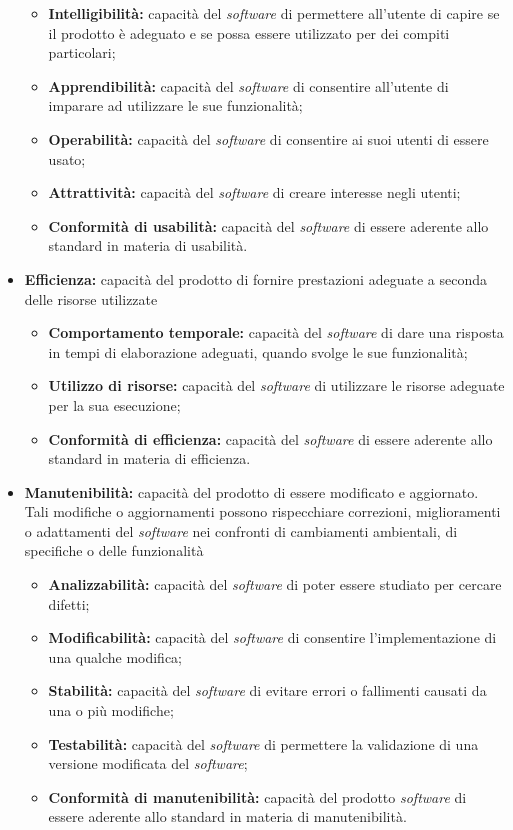 \begin{itemize}
	\begin{itemize}
		\item \textbf{Intelligibilità:} capacità del \textit{software} di 
		permettere all'utente di capire se il prodotto è adeguato e se possa 
		essere utilizzato per dei compiti particolari;
		\item \textbf{Apprendibilità:} capacità del \textit{software} di 
		consentire all'utente di imparare ad utilizzare le sue funzionalità;
		\item \textbf{Operabilità:} capacità del \textit{software} di 
		consentire ai suoi utenti di essere usato;
		\item \textbf{Attrattività:} capacità del \textit{software} di creare 
		interesse negli utenti;
		\item \textbf{Conformità di usabilità:} capacità del 
		\textit{software} di essere aderente allo standard in materia di 
		usabilità.
	\end{itemize}
	
	\item \textbf{Efficienza:} capacità del prodotto di fornire prestazioni adeguate a seconda delle risorse utilizzate
	\begin{itemize}
		\item \textbf{Comportamento temporale:} capacità del \textit{software} 
		di dare una risposta in tempi di elaborazione adeguati, quando svolge 
		le sue funzionalità;
		\item \textbf{Utilizzo di risorse:} capacità del \textit{software} di 
		utilizzare le risorse adeguate per la sua esecuzione;
		\item \textbf{Conformità di efficienza:} capacità del 
		\textit{software} di essere aderente allo standard in materia di 
		efficienza.
	\end{itemize}
	
	\item \textbf{Manutenibilità:} capacità del prodotto di essere modificato e 
	aggiornato. Tali modifiche o aggiornamenti possono rispecchiare correzioni, 
	miglioramenti o adattamenti del \textit{software} nei confronti di cambiamenti ambientali, 
	di specifiche o delle funzionalità
	\begin{itemize}
		\item \textbf{Analizzabilità:} capacità del \textit{software} di poter 
		essere studiato per cercare difetti;
		\item \textbf{Modificabilità:} capacità del \textit{software} di 
		consentire l'implementazione di una qualche modifica;
		\item \textbf{Stabilità:} capacità del \textit{software} di evitare 
		errori o fallimenti causati da una o più modifiche;
		\item \textbf{Testabilità:} capacità del \textit{software} di 
		permettere la validazione di una versione modificata del 
		\textit{software};
		\item \textbf{Conformità di manutenibilità:} capacità del prodotto 
		\textit{software} di essere aderente allo standard in materia di 
		manutenibilità.
	\end{itemize}
	

\end{itemize}
